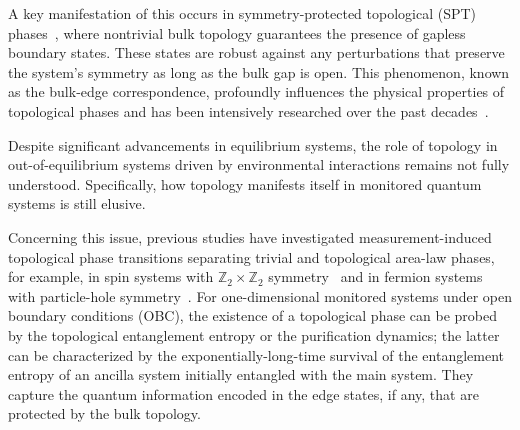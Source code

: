 \documentclass[preprint,pteplogo]{ptephy_v2}%
\numberwithin{equation}{section}
\theoremstyle{definition}
\begin{document}
A key manifestation of this occurs in symmetry-protected topological (SPT) phases~\cite{gu2009tensor, pollmann2010entanglement, chen2011classification, fidkowski2011topological, lu2012theory, chen2013symmetry}, where nontrivial bulk topology guarantees the presence of gapless boundary states.
These states are robust against any perturbations that preserve the system's symmetry as long as the bulk gap is open.
This phenomenon, known as the bulk-edge correspondence, profoundly influences the physical properties of topological phases and has been intensively researched over the past decades~\cite{hasa2010colloquium, qi2011topological, senthil2015symmetry, witten2016fermion, chiu2016classification}.

Despite significant advancements in equilibrium systems, the role of topology in out-of-equilibrium systems driven by environmental interactions remains not fully understood.
Specifically, how topology manifests itself in monitored quantum systems is still elusive.

Concerning this issue, previous studies have investigated measurement-induced topological phase transitions separating trivial and topological area-law phases, for example, in spin systems with $\mathbb{Z}_2\times \mathbb{Z}_2$ symmetry~\cite{Lavasani2021measurement, klocke2022topological, kuno2023production, morralyepes2023detecting} and in fermion systems with particle-hole symmetry~\cite{Nahum2020entanglement, Merritt2023entanglement, kells2023topological, nehra2025controlling, loio2023purification, Klocke23majorana, fava2023nonlinear, pan2024topological, xiao2024topology, Bhuiyan2025freefermion, oshima2025topology}.
For one-dimensional monitored systems under open boundary conditions (OBC), the existence of a topological phase can be probed by the topological entanglement entropy or the purification dynamics; the latter can be characterized by the exponentially-long-time survival of the entanglement entropy of an ancilla system initially entangled with the main system.
They capture the quantum information encoded in the edge states, if any, that are protected by the bulk topology.
\end{document}
